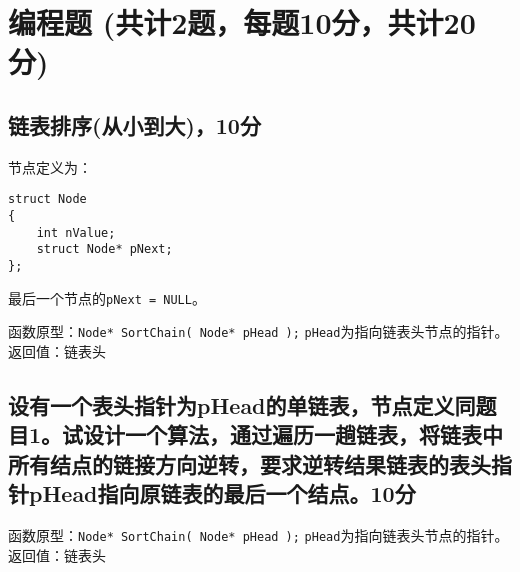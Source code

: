﻿\documentclass  [11pt,twocolumn]{article}
\begin{document}
\section{编程题 (共计2题，每题10分，共计20分)}
\subsection{链表排序(从小到大)，10分}
\begin{minipage}{1\columnwidth}
节点定义为：
\begin{lstlisting}
struct Node
{
    int nValue;
    struct Node* pNext;
};
\end{lstlisting}
最后一个节点的\lstinline{pNext = NULL}。

函数原型：\lstinline{Node* SortChain( Node* pHead );} 
          \lstinline{pHead}为指向链表头节点的指针。
返回值：链表头
\end{minipage}
\pagebreak
\begin{minipage}{1\columnwidth}
\vspace{40ex}
\end{minipage}

\subsection{设有一个表头指针为pHead的单链表，节点定义同题目1。试设计一个算法，通过遍历一趟链表，将链表中所有结点的链接方向逆转，要求逆转结果链表的表头指针pHead指向原链表的最后一个结点。10分}

函数原型：\lstinline{Node* SortChain( Node* pHead );} 
          \lstinline{pHead}为指向链表头节点的指针。
返回值：链表头
\end{document}
